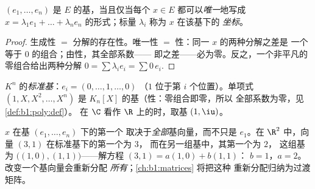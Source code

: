 \begin{proposition}[坐标]\label{prop:b1:vspaces:coordinates}
$(e_1, \dots, e_n)$ 是 $E$ 的基，当且仅当每个 $x \in E$
都可以\emph{唯一}地写成 $x = \lambda_1 e_1 + \dots +
\lambda_n e_n$ 的形式；标量 $\lambda_i$ 称为 $x$ 在该基下的
\emph{坐标}。
\end{proposition}

\begin{proof}
生成性 $=$ 分解的存在性。唯一性 $=$
性：同一 $x$ 的两种分解之差是
一个等于 $0$ 的组合；由性，其全部系数——
即之差——必为零。反之，一个非平凡的
零组合给出两种分解 $0 = \sum \lambda_i
e_i = \sum 0\,e_i$.
\end{proof}

\begin{example}\label{ex:b1:vspaces:bases}
$K^n$ 的\emph{标准基}：$e_i = (0, \dots, 1, \dots, 0)$
（$1$ 位于第 $i$ 个位置）。单项式 $(1, X, X^2, \dots, X^n)$ 是
$K_n[X]$ 的基（性：零组合即零，所以
全部系数为零，见\cref{def:b1:poly:def}）。
在 $\C$ 看作 $\R$ 上的时，取基 $(1, \iu)$。
\end{example}

\begin{remark}[坐标是集体协作的结果]
\label{rem:b1:vspaces:teameffort}
$x$ 在基 $(e_1, \dots, e_n)$ 下的第一个
取决于\emph{全部}基向量，而不只是 $e_1$。在
$\R^2$ 中，向量 $(3, 1)$ 在标准基下的第一个为 $3$，
而在另一组基中，其第一个为 $2$，
这组基为 $\bigl((1,0), (1,1)\bigr)$——解方程 $(3,1) = a(1,0) + b(1,1)$：
$b = 1$，$a = 2$。改变一个基向量会重新分配
\emph{所有}；\cref{ch:b1:matrices} 将把这种
重新分配归纳为过渡矩阵。
\end{remark}

